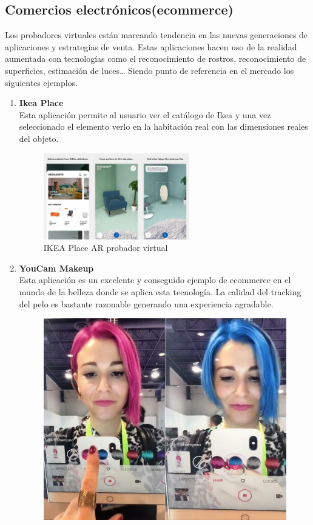 {{{\subsection{Comercios electrónicos(ecommerce)}
Los probadores virtuales están marcando tendencia en las nuevas generaciones de aplicaciones y estrategias de venta. Estas aplicaciones hacen uso de la realidad aumentada con tecnologías como el reconocimiento de rostros, reconocimiento de superficies, estimación de luces… Siendo punto de referencia en el mercado los siguientes ejemplos. 
\begin{enumerate}
\item \textbf{Ikea Place}\\
Esta aplicación permite al usuario ver el catálogo de Ikea y una vez seleccionado el elemento verlo en la habitación real con las dimensiones reales del objeto.
\begin{figure}[H]
     \centering
     \includegraphics[width=0.6\textwidth]{Images/Ikea_App.jpeg}
     \caption{IKEA Place AR probador virtual}
     \label{fig:Ikea}
 \end{figure}
 \item
 \textbf{YouCam Makeup}\\
Esta aplicación es un excelente y conseguido ejemplo de ecommerce en el mundo de la belleza donde se aplica esta tecnología. La calidad del tracking del pelo es bastante razonable generando una experiencia agradable.
\begin{figure}[H]
    \centering
    \includegraphics{Images/Loreal_App.jpeg}

\end{figure}
\end{enumerate}}}}
